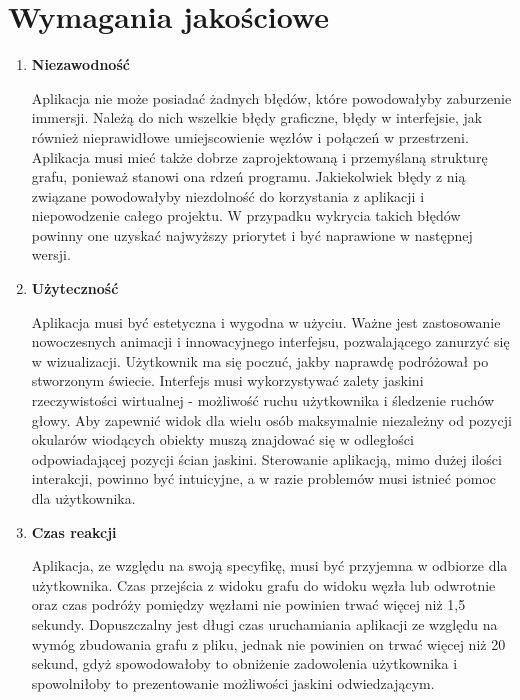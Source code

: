 \section{Wymagania jakościowe}
\begin{enumerate}[label=\textbullet]
\item \textbf{Niezawodność}

Aplikacja nie może posiadać żadnych błędów, które powodowałyby zaburzenie immersji. Należą do nich wszelkie błędy graficzne, błędy w interfejsie, jak również nieprawidłowe umiejscowienie węzłów i połączeń w przestrzeni. Aplikacja musi mieć także dobrze zaprojektowaną i przemyślaną strukturę grafu, ponieważ stanowi ona rdzeń programu. Jakiekolwiek błędy z nią związane powodowałyby niezdolność do korzystania z aplikacji i niepowodzenie całego projektu. W przypadku wykrycia takich błędów powinny one uzyskać najwyższy priorytet i być naprawione w następnej wersji.

\item \textbf{Użyteczność}

Aplikacja musi być estetyczna i wygodna w użyciu. Ważne jest zastosowanie nowoczesnych animacji i innowacyjnego interfejsu, pozwalającego zanurzyć się w wizualizacji. Użytkownik ma się poczuć, jakby naprawdę podróżował po stworzonym świecie. Interfejs musi wykorzystywać zalety jaskini rzeczywistości wirtualnej - możliwość ruchu użytkownika i śledzenie ruchów głowy. Aby zapewnić widok dla wielu osób maksymalnie niezależny od pozycji okularów wiodących obiekty muszą znajdować się w odległości odpowiadającej pozycji ścian jaskini. Sterowanie aplikacją, mimo dużej ilości interakcji, powinno być intuicyjne, a w razie problemów musi istnieć pomoc dla użytkownika.

\item \textbf{Czas reakcji}

Aplikacja, ze względu na swoją specyfikę, musi być przyjemna w odbiorze dla użytkownika. Czas przejścia z widoku grafu do widoku węzła lub odwrotnie oraz czas podróży pomiędzy węzłami nie powinien trwać więcej niż 1,5 sekundy. Dopuszczalny jest długi czas uruchamiania aplikacji ze względu na wymóg zbudowania grafu z pliku, jednak nie powinien on trwać więcej niż 20 sekund, gdyż spowodowałoby to obniżenie zadowolenia użytkownika i spowolniłoby to prezentowanie możliwości jaskini odwiedzającym. 
\end{enumerate}